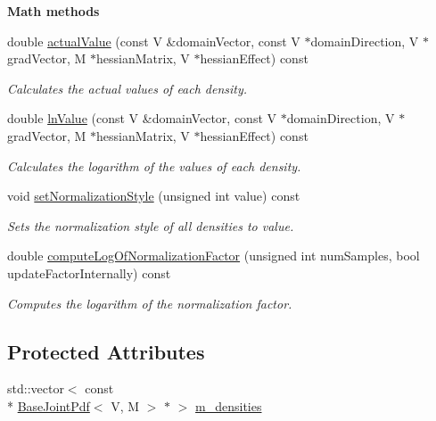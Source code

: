 \begin{Indent}{\bf Math methods}\par
\begin{DoxyCompactItemize}
\item 
double \hyperlink{class_q_u_e_s_o_1_1_concatenated_joint_pdf_a7a3bbf8dab211968e9691a620fee0e4d}{actual\-Value} (const V \&domain\-Vector, const V $\ast$domain\-Direction, V $\ast$grad\-Vector, M $\ast$hessian\-Matrix, V $\ast$hessian\-Effect) const 
\begin{DoxyCompactList}\small\item\em Calculates the actual values of each density. \end{DoxyCompactList}\item 
double \hyperlink{class_q_u_e_s_o_1_1_concatenated_joint_pdf_aca499666e5c3d3d26c562492a15ab112}{ln\-Value} (const V \&domain\-Vector, const V $\ast$domain\-Direction, V $\ast$grad\-Vector, M $\ast$hessian\-Matrix, V $\ast$hessian\-Effect) const 
\begin{DoxyCompactList}\small\item\em Calculates the logarithm of the values of each density. \end{DoxyCompactList}\item 
void \hyperlink{class_q_u_e_s_o_1_1_concatenated_joint_pdf_a686ff513ae812f26f9a71705dd2082ad}{set\-Normalization\-Style} (unsigned int value) const 
\begin{DoxyCompactList}\small\item\em Sets the normalization style of all densities to {\ttfamily value}. \end{DoxyCompactList}\item 
double \hyperlink{class_q_u_e_s_o_1_1_concatenated_joint_pdf_ad960a39a781a7a891df0ae0ee4670199}{compute\-Log\-Of\-Normalization\-Factor} (unsigned int num\-Samples, bool update\-Factor\-Internally) const 
\begin{DoxyCompactList}\small\item\em Computes the logarithm of the normalization factor. \end{DoxyCompactList}\end{DoxyCompactItemize}
\end{Indent}
\subsection*{Protected Attributes}
\begin{DoxyCompactItemize}
\item 
std\-::vector$<$ const \\*
\hyperlink{class_q_u_e_s_o_1_1_base_joint_pdf}{Base\-Joint\-Pdf}$<$ V, M $>$ $\ast$ $>$ \hyperlink{class_q_u_e_s_o_1_1_concatenated_joint_pdf_a42ee130daadf7ceb0d1745011f5b1169}{m\-\_\-densities}
\end{DoxyCompactItemize}
